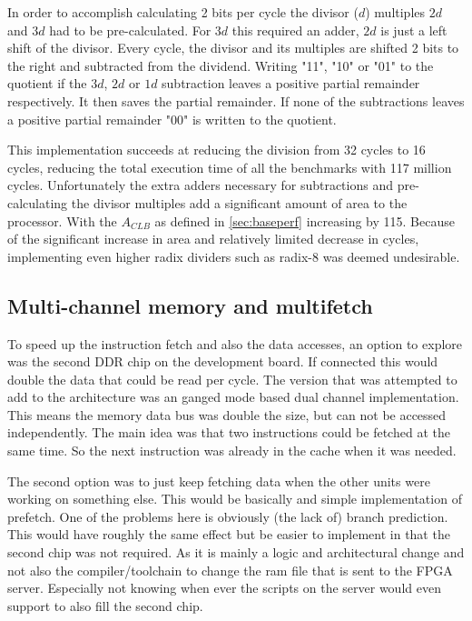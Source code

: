 \documentclass[final]{article}
\begin{document}
In order to accomplish calculating 2 bits per cycle the divisor ($d$) multiples $2d$ and $3d$ had to be pre-calculated. For $3d$ this required an adder, $2d$ is just a left shift of the divisor. Every cycle, the divisor and its multiples are shifted 2 bits to the right and subtracted from the dividend. Writing "11", "10" or "01" to the quotient if the $3d$, $2d$ or $1d$ subtraction leaves a positive partial remainder respectively. It then saves the partial remainder. If none of the subtractions leaves a positive partial remainder "00" is written to the quotient.

This implementation succeeds at reducing the division from 32 cycles to 16 cycles, reducing the total execution time of all the benchmarks with 117 million cycles. Unfortunately the extra adders necessary for subtractions and pre-calculating the divisor multiples add a significant amount of area to the processor. With the $A_{CLB}$ as defined in \cref{sec:baseperf} increasing by 115. Because of the significant increase in area and relatively limited decrease in cycles, implementing even higher radix dividers such as radix-8 was deemed undesirable.

\subsection{Multi-channel memory and multifetch}
To speed up the instruction fetch and also the data accesses, an option to explore was the second DDR chip on the development board.
If connected this would double the data that could be read per cycle.
The version that was attempted to add to the architecture was an ganged mode based dual channel implementation.
This means the memory data bus was double the size, but can not be accessed independently.
The main idea was that two instructions could be fetched at the same time.
So the next instruction was already in the cache when it was needed.

The second option was to just keep fetching data when the other units were working on something else.
This would be basically and simple implementation of prefetch.
One of the problems here is obviously (the lack of) branch prediction.
This would have roughly the same effect but be easier to implement in that the second chip was not required.
As it is mainly a logic and architectural change and not also the compiler/toolchain to change the ram file that is sent to the FPGA server.
Especially not knowing when ever the scripts on the server would even support to also fill the second chip.
\end{document}
